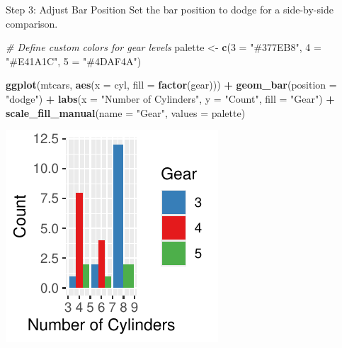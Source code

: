 \documentclass[
  ignorenonframetext,
]{beamer}
\newenvironment{Shaded}{\begin{snugshade}}{\end{snugshade}}
\newcommand{\AttributeTok}[1]{\textcolor[rgb]{0.13,0.29,0.53}{#1}}
\newcommand{\CommentTok}[1]{\textcolor[rgb]{0.56,0.35,0.01}{\textit{#1}}}
\newcommand{\FunctionTok}[1]{\textcolor[rgb]{0.13,0.29,0.53}{\textbf{#1}}}
\newcommand{\NormalTok}[1]{#1}
\newcommand{\OtherTok}[1]{\textcolor[rgb]{0.56,0.35,0.01}{#1}}
\newcommand{\SpecialCharTok}[1]{\textcolor[rgb]{0.81,0.36,0.00}{\textbf{#1}}}
\newcommand{\StringTok}[1]{\textcolor[rgb]{0.31,0.60,0.02}{#1}}
\begin{document}
\begin{frame}[fragile]{Step 3: Adjust Bar Position}
\label{step-3-adjust-bar-position}
Set the bar position to dodge for a side-by-side comparison.


\begin{Shaded}
\begin{Highlighting}[]
\CommentTok{\# Define custom colors for gear levels}
\NormalTok{palette }\OtherTok{\textless{}{-}} \FunctionTok{c}\NormalTok{(}\StringTok{\textasciigrave{}}\AttributeTok{3}\StringTok{\textasciigrave{}} \OtherTok{=} \StringTok{"\#377EB8"}\NormalTok{, }\StringTok{\textasciigrave{}}\AttributeTok{4}\StringTok{\textasciigrave{}} \OtherTok{=} \StringTok{"\#E41A1C"}\NormalTok{, }\StringTok{\textasciigrave{}}\AttributeTok{5}\StringTok{\textasciigrave{}} \OtherTok{=} \StringTok{"\#4DAF4A"}\NormalTok{)}

\FunctionTok{ggplot}\NormalTok{(mtcars, }\FunctionTok{aes}\NormalTok{(}\AttributeTok{x =}\NormalTok{ cyl, }\AttributeTok{fill =} \FunctionTok{factor}\NormalTok{(gear))) }\SpecialCharTok{+} \FunctionTok{geom\_bar}\NormalTok{(}\AttributeTok{position =} \StringTok{"dodge"}\NormalTok{) }\SpecialCharTok{+}
    \FunctionTok{labs}\NormalTok{(}\AttributeTok{x =} \StringTok{"Number of Cylinders"}\NormalTok{, }\AttributeTok{y =} \StringTok{"Count"}\NormalTok{, }\AttributeTok{fill =} \StringTok{"Gear"}\NormalTok{) }\SpecialCharTok{+}
    \FunctionTok{scale\_fill\_manual}\NormalTok{(}\AttributeTok{name =} \StringTok{"Gear"}\NormalTok{, }\AttributeTok{values =}\NormalTok{ palette)}
\end{Highlighting}
\end{Shaded}

\begin{center}\includegraphics[width=0.5\linewidth]{Figs/unnamed-chunk-30-1} \end{center}
\end{frame}
\end{document}
